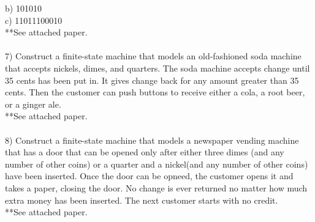 \documentclass{article}
\begin{document}
\begin{flushleft}
\setlength\parindent{24pt}b) 101010 \\
\setlength\parindent{24pt}c) 11011100010 \\
**See attached paper. \\
~\\
\setlength\parindent{0pt}7) Construct a finite-state machine that models an old-fashioned soda machine that accepts nickels, dimes, and quarters.  The soda machine accepts change until 35 cents has been put in.  It gives change back for any amount greater than 35 cents.  Then the customer can push buttons to receive either a cola, a root beer, or a ginger ale. \\
**See attached paper. \\
~\\
\setlength\parindent{0pt}8) Construct a finite-state machine that models a newspaper vending machine that has a door that can be opened only after either three dimes (and any number of other coins) or a quarter and a nickel(and any number of other coins) have been inserted.  Once the door can be opneed, the customer opens it and takes a paper, closing the door.  No change is ever returned no matter how much extra money has been inserted.  The next customer starts  with no credit. \\
**See attached paper. \\
\end{flushleft}
\end{document}
